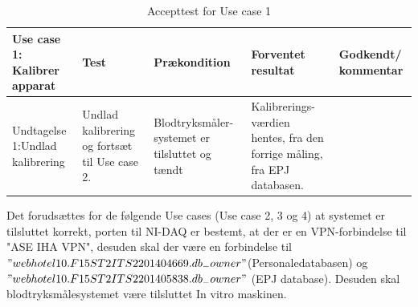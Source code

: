\begin{table}[H]
\caption{Accepttest for Use case 1}\label{tab:tabel8}
\begin{tabular}{|>{\raggedright\arraybackslash}p{2.5cm}| >{\raggedright\arraybackslash}p{2.9cm} | >{\raggedright\arraybackslash}p{2.9cm} | >{\raggedright\arraybackslash}p{2.9cm} | >{\raggedright\arraybackslash}p{2.8cm} |}
   \hline
   \textbf{Use case 1: Kalibrer apparat} &\textbf{Test}& \textbf{Prækondition} & \textbf{Forventet resultat} & \textbf{Godkendt/ kommentar}\\ \hline
 Undtagelse 1:Undlad kalibrering & Undlad kalibrering og fortsæt til Use case 2. & Blodtryksmåler-systemet er tilsluttet og tændt & Kalibrerings-værdien hentes, fra den forrige måling, fra EPJ databasen. & \\\hline
\end{tabular}
\end{table}
Det forudsættes for de følgende Use cases (Use case 2, 3 og 4) at systemet er tilsluttet korrekt, porten til NI-DAQ er bestemt, at der er en VPN-forbindelse til "ASE IHA VPN", desuden skal der være en forbindelse til $"webhotel10.F15ST2ITS2201404669.db_{-}owner"$(Personaledatabasen) og $"webhotel10.F15ST2ITS2201405838.db_{-}owner"$ (EPJ database). Desuden skal blodtryksmålesystemet være tilsluttet In vitro maskinen.
